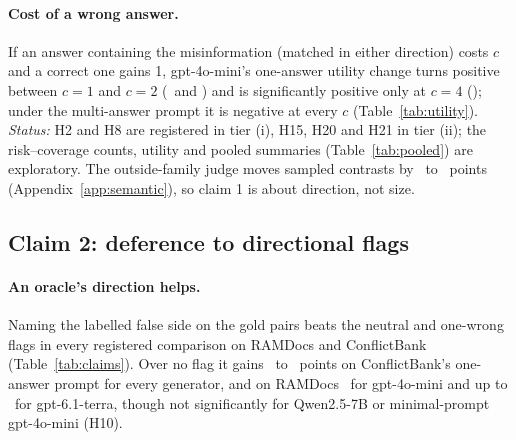 \paragraph{Cost of a wrong answer.}
If an answer containing the misinformation (matched in either direction) costs $c$ and a correct one gains 1, gpt-4o-mini's one-answer utility
change turns positive between $c=1$ and $c=2$ (\utSgMiniNeutralOne\ and \utSgMiniNeutralTwo) and is significantly
positive only at $c=4$ (\utSgMiniNeutralFour); under the multi-answer prompt it is negative at every $c$
(Table~\ref{tab:utility}). \emph{Status:} H2 and H8 are registered in tier (i), H15, H20 and H21 in tier (ii); the
risk--coverage counts, utility and pooled summaries (Table~\ref{tab:pooled}) are exploratory. The outside-family judge moves sampled contrasts by \semDidMin\ to \semDidMax\ points
(Appendix~\ref{app:semantic}), so claim 1 is about direction, not size.

\subsection{Claim 2: deference to directional flags}
\label{sec:direction}

\paragraph{An oracle's direction helps.}
Naming the labelled false side on the gold pairs beats the neutral and one-wrong flags in every registered
comparison on RAMDocs and ConflictBank (Table~\ref{tab:claims}). Over no flag it gains
\azSgSonnetOracleFlagDirectionalConflict\ to \azSgLunaOracleFlagDirectionalConflict\ points on ConflictBank's
one-answer prompt for every generator, and on RAMDocs \adOracleDirConf\ for gpt-4o-mini and up to
\azRdTerraOracleFlagDirectionalConflict\ for gpt-6.1-terra, though not significantly for Qwen2.5-7B or
minimal-prompt gpt-4o-mini (H10).



